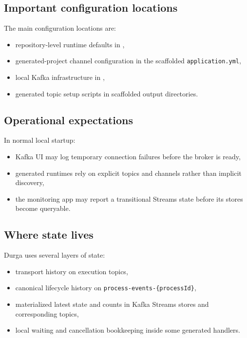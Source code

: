 \subsection{Important configuration locations}

The main configuration locations are:
\begin{itemize}
\item repository-level runtime defaults in ,
\item generated-project channel configuration in the scaffolded \texttt{application.yml},
\item local Kafka infrastructure in ,
\item generated topic setup scripts in scaffolded output directories.
\end{itemize}

\subsection{Operational expectations}

In normal local startup:
\begin{itemize}
\item Kafka UI may log temporary connection failures before the broker is ready,
\item generated runtimes rely on explicit topics and channels rather than implicit discovery,
\item the monitoring app may report a transitional Streams state before its stores become queryable.
\end{itemize}

\subsection{Where state lives}

Durga uses several layers of state:
\begin{itemize}
\item transport history on execution topics,
\item canonical lifecycle history on \texttt{process-events-\{processId\}},
\item materialized latest state and counts in Kafka Streams stores and corresponding topics,
\item local waiting and cancellation bookkeeping inside some generated handlers.
\end{itemize}

